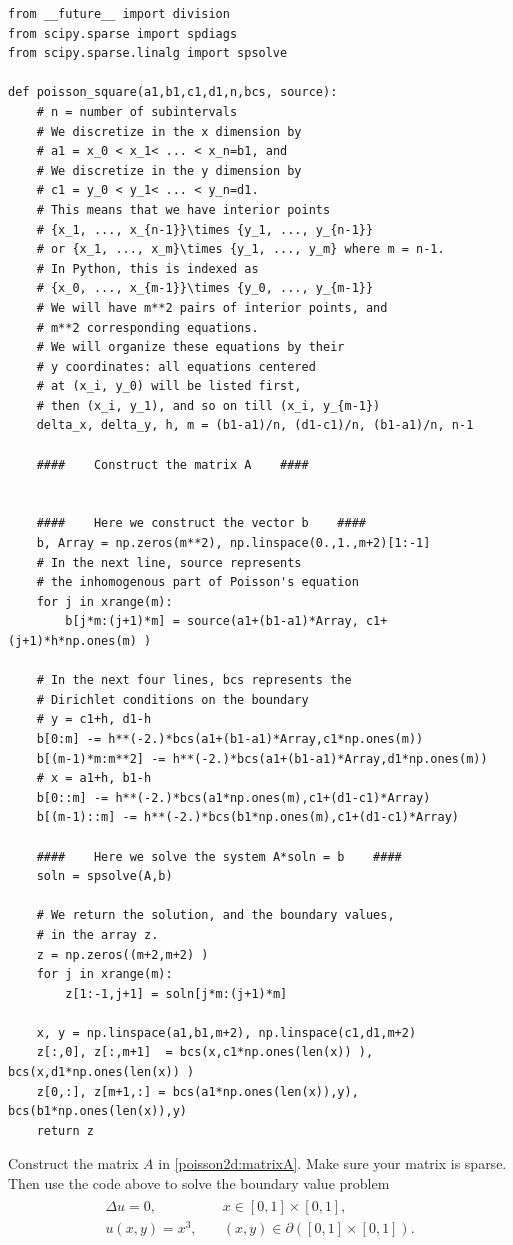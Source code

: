 \begin{lstlisting}
from __future__ import division
from scipy.sparse import spdiags
from scipy.sparse.linalg import spsolve

def poisson_square(a1,b1,c1,d1,n,bcs, source): 
	# n = number of subintervals
	# We discretize in the x dimension by 
	# a1 = x_0 < x_1< ... < x_n=b1, and 
	# We discretize in the y dimension by 
	# c1 = y_0 < y_1< ... < y_n=d1. 
	# This means that we have interior points 
	# {x_1, ..., x_{n-1}}\times {y_1, ..., y_{n-1}}
	# or {x_1, ..., x_m}\times {y_1, ..., y_m} where m = n-1. 
	# In Python, this is indexed as 
	# {x_0, ..., x_{m-1}}\times {y_0, ..., y_{m-1}}
	# We will have m**2 pairs of interior points, and 
	# m**2 corresponding equations.
	# We will organize these equations by their 
	# y coordinates: all equations centered 
	# at (x_i, y_0) will be listed first, 
	# then (x_i, y_1), and so on till (x_i, y_{m-1})
	delta_x, delta_y, h, m = (b1-a1)/n, (d1-c1)/n, (b1-a1)/n, n-1
	
	####    Construct the matrix A    ####
	
	
	####    Here we construct the vector b    ####
	b, Array = np.zeros(m**2), np.linspace(0.,1.,m+2)[1:-1]
	# In the next line, source represents 
	# the inhomogenous part of Poisson's equation
	for j in xrange(m): 
		b[j*m:(j+1)*m] = source(a1+(b1-a1)*Array, c1+(j+1)*h*np.ones(m) )
	
    # In the next four lines, bcs represents the 
	# Dirichlet conditions on the boundary
	# y = c1+h, d1-h
	b[0:m] -= h**(-2.)*bcs(a1+(b1-a1)*Array,c1*np.ones(m))
	b[(m-1)*m:m**2] -= h**(-2.)*bcs(a1+(b1-a1)*Array,d1*np.ones(m))
	# x = a1+h, b1-h
	b[0::m] -= h**(-2.)*bcs(a1*np.ones(m),c1+(d1-c1)*Array) 
	b[(m-1)::m] -= h**(-2.)*bcs(b1*np.ones(m),c1+(d1-c1)*Array)
	
    ####    Here we solve the system A*soln = b    ####
	soln = spsolve(A,b) 
	
	# We return the solution, and the boundary values, 
	# in the array z.
	z = np.zeros((m+2,m+2) ) 
	for j in xrange(m): 
		z[1:-1,j+1] = soln[j*m:(j+1)*m]
	
	x, y = np.linspace(a1,b1,m+2), np.linspace(c1,d1,m+2)
	z[:,0], z[:,m+1]  = bcs(x,c1*np.ones(len(x)) ), bcs(x,d1*np.ones(len(x)) )
	z[0,:], z[m+1,:] = bcs(a1*np.ones(len(x)),y), bcs(b1*np.ones(len(x)),y)
	return z

\end{lstlisting}

\begin{problem}
Construct the matrix $A$ in \eqref{poisson2d:matrixA}. Make sure your matrix is sparse. Then use the code 
above to solve the boundary value problem
\begin{align}
	\begin{split}
	\Delta u = 0, &{}\quad x \in [0,1]\times [0,1],\\
	u(x,y) = x^3, &{}\quad (x,y) \in \partial ([0,1]\times [0,1]).
	\end{split}
	\label{poisson2d:laplace}
\end{align}
\end{problem}

